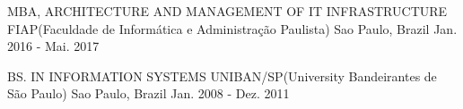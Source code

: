 

\begin{cventries}

  \cventry
    {MBA, ARCHITECTURE AND MANAGEMENT OF IT INFRASTRUCTURE} %
    {FIAP(Faculdade de Informática e Administração Paulista)} %
    {Sao Paulo, Brazil} %
    {Jan. 2016 - Mai. 2017} %
    {
      \begin{cvitems} %
      \end{cvitems}
    }
  
  \cventry
    {BS. IN INFORMATION SYSTEMS} %
    {UNIBAN/SP(University Bandeirantes de São Paulo)} %
    {Sao Paulo, Brazil} %
    {Jan. 2008 - Dez. 2011} %
    {
      \begin{cvitems} %
      \end{cvitems}
    }

\end{cventries}
